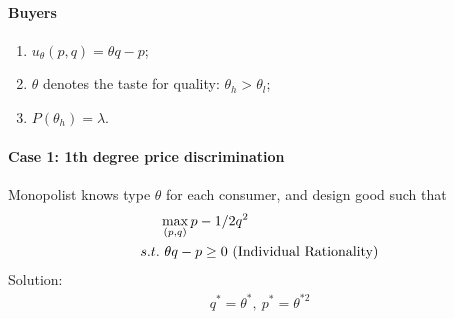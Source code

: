\documentclass{article}
\begin{document}
   	\paragraph{Buyers}
   	\begin{enumerate}
   		\item $u_\theta (p, q) = \theta q - p$;
   		\item $\theta$ denotes the taste for quality: $\theta_h > \theta_l$;
   		\item $P(\theta_h) = \lambda$.
   	\end{enumerate}
   	
   	\paragraph{Case 1: 1th degree price discrimination}
   	Monopolist knows type $\theta$ for each consumer, and design good such that
   	\begin{align}
   		&\max_{(p, q)} p - 1/2 q^2 \\
   		s.t.&\ \theta q - p \geq 0 \text{{ (Individual Rationality)}}
   	\end{align}
   	Solution:
   	\begin{align}
   		q^* = \theta^*,\ p^* = \theta^{*2}
   	\end{align}
   	
\end{document}
